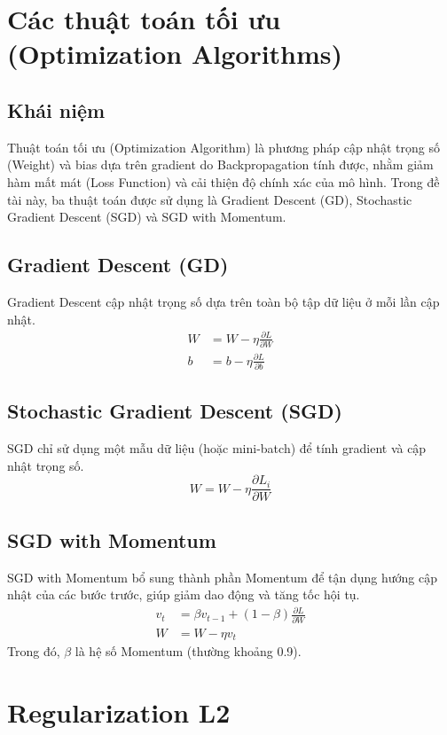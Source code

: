 \documentclass[12pt,a4paper]{report}
\begin{document}
\section{Các thuật toán tối ưu (Optimization Algorithms)}
\subsection{Khái niệm}
Thuật toán tối ưu (Optimization Algorithm) là phương pháp cập nhật trọng số (Weight) và bias dựa trên gradient do Backpropagation tính được, nhằm giảm hàm mất mát (Loss Function) và cải thiện độ chính xác của mô hình. Trong đề tài này, ba thuật toán được sử dụng là Gradient Descent (GD), Stochastic Gradient Descent (SGD) và SGD with Momentum.

\subsection{Gradient Descent (GD)}
Gradient Descent cập nhật trọng số dựa trên toàn bộ tập dữ liệu ở mỗi lần cập nhật.
\begin{align}
    W &= W - \eta \frac{\partial L}{\partial W} \\
    b &= b - \eta \frac{\partial L}{\partial b}
\end{align}

\subsection{Stochastic Gradient Descent (SGD)}
SGD chỉ sử dụng một mẫu dữ liệu (hoặc mini-batch) để tính gradient và cập nhật trọng số.
\begin{equation}
    W = W - \eta \frac{\partial L_i}{\partial W}
\end{equation}

\subsection{SGD with Momentum}
SGD with Momentum bổ sung thành phần Momentum để tận dụng hướng cập nhật của các bước trước, giúp giảm dao động và tăng tốc hội tụ.
\begin{align}
    v_t &= \beta v_{t-1} + (1 - \beta)\frac{\partial L}{\partial W} \\
    W &= W - \eta v_t
\end{align}
Trong đó, $\beta$ là hệ số Momentum (thường khoảng 0.9).

\section{Regularization L2}
\end{document}
